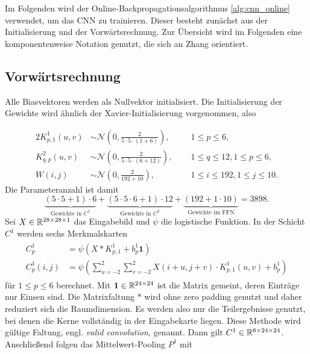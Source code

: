 Im Folgenden wird der Online-Backpropagationsalgorithmus \ref{alg:cnn_online} verwendet, um das CNN zu trainieren. Dieser besteht zunächst aus der Initialisierung und der Vorwärtsrechnung. Zur Übersicht wird im Folgenden eine komponentenweise Notation genutzt, die sich an Zhang \cite{key} orientiert. 

\subsection*{Vorwärtsrechnung}
Alle Biasvektoren werden als Nullvektor initialisiert. Die Initialisierung der Gewichte wird ähnlich der Xavier-Initialisierung \cite{DBLP:journals/jmlr/GlorotB10} vorgenommen, also

\begin{alignat*}{2}
    K^{1}_{p,1}(u,v) &\sim  \mathcal{N} \left(0, \frac{2}{5 \cdot 5 \cdot (1+6)}\right), \; \; && 1 \leq p \leq 6,\\
    K^{2}_{q,p}(u,v) &\sim  \mathcal{N} \left(0, \frac{2}{5 \cdot 5 \cdot (6+12)}\right),\; \; && 1 \leq q \leq 12, 1 \leq p \leq 6,\\
    W(i,j) &\sim \mathcal{N} \left(0, \frac{2}{192+10}\right), \; \; &&1 \leq i \leq 192 , 1 \leq j \leq 10.
\end{alignat*}
Die Parameteranzahl ist damit 
\begin{equation*}
    \underbrace{(5 \cdot 5 +1) \cdot 6}_{\text{Gewichte in $C^1$}}+\underbrace{(5 \cdot 5 \cdot 6+1) \cdot 12}_{\text{Gewichte in $C^2$}}+\underbrace{(192+1 \cdot 10)}_{\text{Gewichte im FFN}}=3898.
\end{equation*}
 Sei $X \in \mathbb{R}^{28 \times 28 \times 1}$ das Eingabebild und $\psi$ die logistische Funktion. In der Schicht $C^1$ werden sechs Merkmalskarten 
\begin{align*}
    \label{eq:C1_forw}
    \begin{split}
    C_p^1 &= \psi(X \ast K_{p,1}^1+b_p^1 \mathbf{1}) \\
    C_p^1(i,j)&=\psi \left(\sum_{u=-2}^2 \sum_{v=-2}^2 X(i+u,j+v) \cdot K_{p,1}^1(u,v) +b_p^1\right)
    \end{split}
\end{align*}
für $1 \leq p \leq 6$ berechnet. Mit $\mathbf{1} \in \mathbb{R}^{24 \times 24}$ ist die Matrix gemeint, deren Einträge nur Einsen sind. Die Matrixfaltung $\ast$ wird ohne zero padding genutzt und daher reduziert sich die Raumdimension. Es werden also nur die Teilergebnisse genutzt, bei denen die Kerne vollständig in der Eingabekarte liegen. Diese Methode wird gültige Faltung, engl. \textit{valid convolution}, genannt. Dann gilt $C^1 \in \mathbb{R}^{6 \times 24 \times 24}$. Anschließend folgen das Mittelwert-Pooling $P^1$ mit
